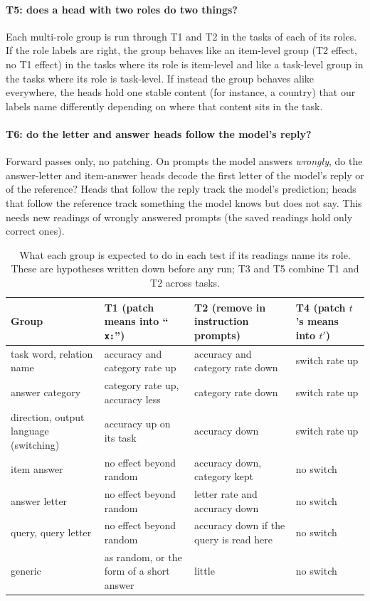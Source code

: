 \documentclass[10pt,a4paper]{article}
\newcommand{\p}[1]{``\texttt{#1}''}
\begin{document}
\paragraph{T5: does a head with two roles do two things?} Each multi-role group is run through T1 and T2 in the tasks of each of its roles. If the role labels are right, the group behaves like an item-level group (T2 effect, no T1 effect) in the tasks where its role is item-level and like a task-level group in the tasks where its role is task-level. If instead the group behaves alike everywhere, the heads hold one stable content (for instance, a country) that our labels name differently depending on where that content sits in the task.

\paragraph{T6: do the letter and answer heads follow the model's reply?} Forward passes only, no patching. On prompts the model answers \emph{wrongly}, do the answer-letter and item-answer heads decode the first letter of the model's reply or of the reference? Heads that follow the reply track the model's prediction; heads that follow the reference track something the model knows but does not say. This needs new readings of wrongly answered prompts (the saved readings hold only correct ones).

\begin{table}[tbp]
\centering\small
\begin{tabularx}{\textwidth}{@{}lLLL@{}}
\toprule
Group & T1 (patch means into \p{ x:}) & T2 (remove in instruction prompts) & T4 (patch $t$'s means into $t'$) \\
\midrule
task word, relation name & accuracy and category rate up & accuracy and category rate down & switch rate up \\
answer category & category rate up, accuracy less & category rate down & switch rate up \\
direction, output language (switching) & accuracy up on its task & accuracy down & switch rate up \\
item answer & no effect beyond random & accuracy down, category kept & no switch \\
answer letter & no effect beyond random & letter rate and accuracy down & no switch \\
query, query letter & no effect beyond random & accuracy down if the query is read here & no switch \\
generic & as random, or the form of a short answer & little & no switch \\
\bottomrule
\end{tabularx}
\caption{What each group is expected to do in each test if its readings name its role. These are hypotheses written down before any run; T3 and T5 combine T1 and T2 across tasks.}
\label{tab:predictions}
\end{table}
\end{document}

